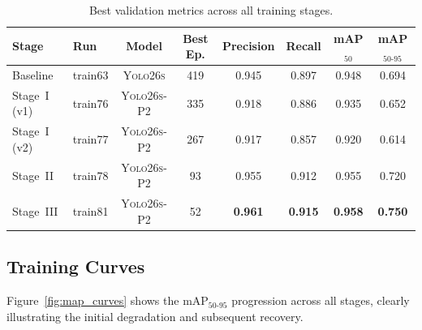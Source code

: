 \documentclass[12pt, titlepage]{article}
\begin{document}
\begin{table}[h]
  \centering
  \caption{Best validation metrics across all training stages.}
  \label{tab:results}
  \begin{tabular}{@{}llcccccc@{}}
    \toprule
    \textbf{Stage}     & \textbf{Run}    & \textbf{Model}      & \textbf{Best Ep.} &
    \textbf{Precision} & \textbf{Recall} & \textbf{mAP$_{50}$} &
    \textbf{mAP$_{50\text{-}95}$}                                                                                                                      \\
    \midrule
    Baseline           & train63         & \textsc{Yolo26s}    & 419               & 0.945          & 0.897          & 0.948          & 0.694          \\
    \midrule
    Stage~I (v1)       & train76         & \textsc{Yolo26s-P2} & 335               & 0.918          & 0.886          & 0.935          & 0.652          \\
    Stage~I (v2)       & train77         & \textsc{Yolo26s-P2} & 267               & 0.917          & 0.857          & 0.920          & 0.614          \\
    \midrule
    Stage~II           & train78         & \textsc{Yolo26s-P2} & 93                & 0.955          & 0.912          & 0.955          & 0.720          \\
    \midrule
    Stage~III          & train81         & \textsc{Yolo26s-P2} & 52                & \textbf{0.961} & \textbf{0.915} & \textbf{0.958} & \textbf{0.750} \\
    \bottomrule
  \end{tabular}
\end{table}

\subsection{Training Curves}

Figure~\ref{fig:map_curves} shows the mAP$_{50\text{-}95}$ progression across
all stages, clearly illustrating the initial degradation and subsequent
recovery.
\end{document}

